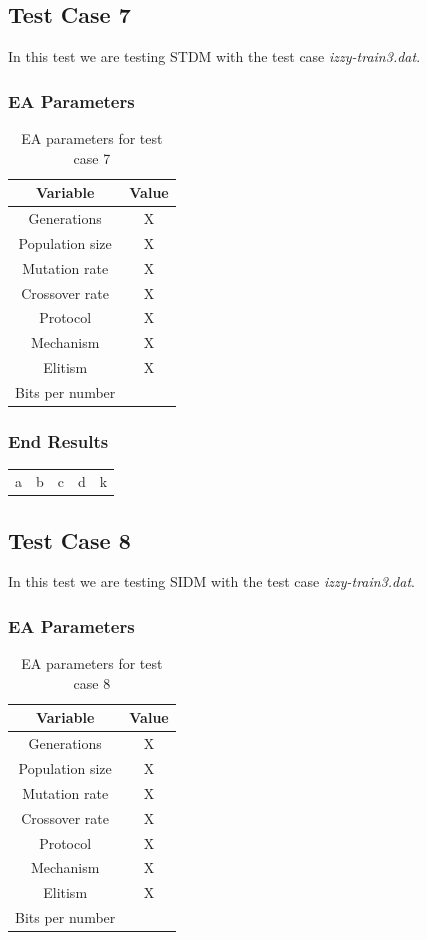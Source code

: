 \subsection{Test Case 7}\label{sec:test-case-7}
In this test we are testing STDM with the test case
\textit{izzy-train3.dat}.
\subsubsection{EA Parameters}\label{sec:test-case-7-parameters}
\begin{table}
	\begin{tabular}{c c}
		Variable & Value \\
		\hline
		Generations & X \\
		\hline
		Population size & X \\
		\hline
		Mutation rate & X \\
		\hline
		Crossover rate & X \\
		\hline
		Protocol & X \\
		\hline
		Mechanism & X \\
		\hline
		Elitism & X \\
		\hline
		Bits per number & \\
	\end{tabular}
	\caption{EA parameters for test case 7}
\end{table}
\subsubsection{End Results}\label{sec:test-case-7-results}
\begin{table}
	\begin{tabular}{c c c c c}
		a & b & c & d & k \\
	\end{tabular}
\end{table}

\subsection{Test Case 8}\label{sec:test-case-8}
In this test we are testing SIDM with the test case
\textit{izzy-train3.dat}.
\subsubsection{EA Parameters}\label{sec:test-case-8-parameters}
\begin{table}
	\begin{tabular}{c c}
		Variable & Value \\
		\hline
		Generations & X \\
		\hline
		Population size & X \\
		\hline
		Mutation rate & X \\
		\hline
		Crossover rate & X \\
		\hline
		Protocol & X \\
		\hline
		Mechanism & X \\
		\hline
		Elitism & X \\
		\hline
		Bits per number & \\
	\end{tabular}
	\caption{EA parameters for test case 8}
\end{table}
